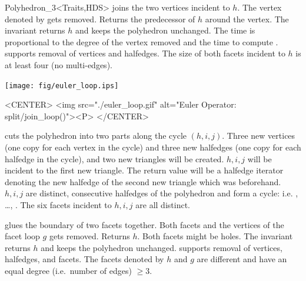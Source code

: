 \begin{ccClassTemplate}{Polyhedron_3<Traits,HDS>}
    {joins the two vertices incident to $h$. The vertex denoted by
       gets removed. Returns the predecessor of
    $h$ around the vertex. The invariant 
     returns
    $h$ and keeps the polyhedron unchanged. 
    The time is proportional to the degree of the vertex removed and 
    the time to compute .
    \ccPrecond {} supports removal of vertices and halfedges. The
    size of both facets incident to $h$ is at least four (no multi-edges).}

\newpage
{}

\begin{ccTexOnly}
    \begin{center}
      \parbox{0.636\textwidth}{%
          \texttt{[image: fig/euler\_loop.ips]}%
      }
    \end{center}
\end{ccTexOnly}

\begin{ccHtmlOnly}
    <CENTER>
    <img src="./euler_loop.gif" alt="Euler Operator: split/join_loop()"><P>
    </CENTER>
\end{ccHtmlOnly}

   {cuts the polyhedron into two parts along the cycle $(h,i,j)$.
    Three new vertices (one copy for each vertex in the cycle) and
    three new halfedges (one copy for each halfedge in the cycle), and
    two new triangles will be 
    created. $h,i,j$ will be incident to the first new triangle.
    The return value will be a halfedge iterator denoting the
    new halfedge of the second new triangle which was 
    beforehand.
    \ccPrecond $h,i,j$ are distinct, consecutive halfedges of the
    polyhedron and form a cycle: i.e. , \ldots, . The six facets incident to $h,i,j$ are all
    distinct.
}

   {glues the boundary of two facets together.
    Both facets and the vertices of the facet loop $g$ gets removed. 
    Returns $h$.  Both facets might be holes.  
    The invariant  
    returns  $h$ and keeps the polyhedron unchanged.
    \ccPrecond {} supports removal of vertices, halfedges, and 
    facets. The facets denoted by $h$ and $g$ are different and have an
    equal degree (i.e.~number of edges) $\geq 3$.} 


\end{ccClassTemplate}
